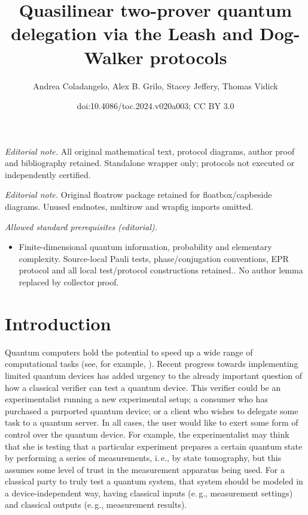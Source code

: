 \documentclass[11pt]{article}
\title{Quasilinear two-prover quantum delegation via the Leash and Dog-Walker protocols}
\author{Andrea Coladangelo, Alex B. Grilo, Stacey Jeffery, Thomas Vidick}
\date{doi:10.4086/toc.2024.v020a003; CC BY 3.0}
\numberwithin{equation}{section}
\theoremstyle{definition}
\theoremstyle{plain}
\newcommand{\ie}{i.\,e.}
\newcommand{\eg}{e.\,g.}
\begin{document}
\maketitle
\noindent\textit{Editorial note.} All original mathematical text, protocol diagrams, author proof and bibliography retained. Standalone wrapper only; protocols not executed or independently certified.\par\medskip
\noindent\textit{Editorial note.} Original floatrow package retained for floatbox/capbeside diagrams. Unused endnotes, multirow and wrapfig imports omitted.\par\medskip
\noindent\textit{Allowed standard prerequisites (editorial).}\begin{itemize}
\item Finite-dimensional quantum information, probability and elementary complexity. Source-local Pauli tests, phase/conjugation conventions, EPR protocol and all local test/protocol constructions retained.. No author lemma replaced by collector proof.
\end{itemize}\medskip
\section{Introduction}

Quantum computers hold the potential to speed up a wide range of computational tasks (see, for example, \cite{montanaro2016survey}). Recent progress towards implementing limited quantum devices has added urgency to the already important question of how a classical verifier can test a quantum device. This verifier could be an experimentalist running a new experimental setup; a consumer who has purchased a purported quantum device; or a client who wishes to delegate some task to a quantum server. In all cases, the user would like to exert some form of control over the quantum device. For example, the experimentalist may think that she is testing that a particular experiment prepares a certain quantum state by performing a series of measurements, \ie, by state tomography, but this assumes some level of trust in the measurement apparatus being used.  For a classical party to truly test a quantum system, that system should be modeled in a device-independent way, having classical inputs (\eg, measurement settings) and classical outputs (\eg, measurement results). 
\end{document}
